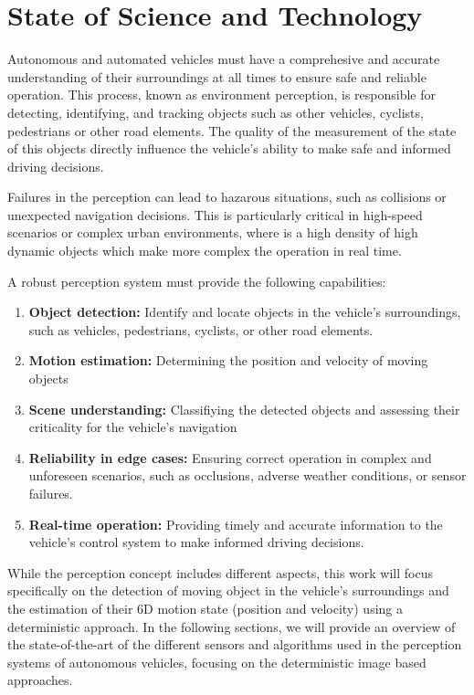 \chapter{State of Science and Technology}%
\label{chap:StateOfArt}%

Autonomous and automated vehicles must have a comprehesive and accurate understanding of their surroundings at 
all times to ensure safe and reliable operation. This process, known as environment perception, is responsible
for detecting, identifying, and tracking objects such as other vehicles, cyclists, pedestrians or other
road elements. The quality of the measurement of the state of this objects directly influence the vehicle's
ability to make safe and informed driving decisions. 

Failures in the perception can lead to hazarous situations, such as collisions or unexpected navigation decisions.
This is particularly critical in high-speed scenarios or complex urban environments, where is a high density of
high dynamic objects which make more complex the operation in real time. 

A robust perception system must provide the following capabilities:

\begin{enumerate}
  \item \textbf{Object detection:} Identify and locate objects in the vehicle's surroundings, such as vehicles, pedestrians, cyclists, or other road elements.
  \item \textbf{Motion estimation:} Determining the position and velocity of moving objects
  \item \textbf{Scene understanding:} Classifiying the detected objects and assessing their criticality for the vehicle's navigation
  \item \textbf{Reliability in edge cases:} Ensuring correct operation in complex and unforeseen scenarios, such as occlusions, adverse weather conditions, or sensor failures.
  \item \textbf{Real-time operation:} Providing timely and accurate information to the vehicle's control system to make informed driving decisions.
\end{enumerate}

While the perception concept includes different aspects, this work will focus specifically on the detection of 
moving object in the vehicle's surroundings and the estimation of their 6D motion state (position and velocity) 
using a deterministic approach. In the following sections, we will provide an overview of the state-of-the-art of
the different sensors and algorithms used in the perception systems of autonomous vehicles, focusing on the deterministic image
based approaches.

